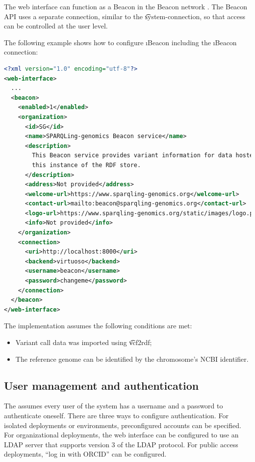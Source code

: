   The web interface can function as a Beacon in the Beacon network
  \citep{beacon-network}.  The Beacon API uses a separate connection,
  similar to the \t{system-connection}, so that access can be
  controlled at the user level.

  The following example shows how to configure \i{Beacon} including the
  \i{Beacon connection}:

\begin{lstlisting}[language=XML]
<?xml version="1.0" encoding="utf-8"?>
<web-interface>
  ...
  <beacon>
    <enabled>1</enabled>
    <organization>
      <id>SG</id>
      <name>SPARQLing-genomics Beacon service</name>
      <description>
        This Beacon service provides variant information for data hosted by
        this instance of the RDF store.
      </description>
      <address>Not provided</address>
      <welcome-url>https://www.sparqling-genomics.org</welcome-url>
      <contact-url>mailto:beacon@sparqling-genomics.org</contact-url>
      <logo-url>https://www.sparqling-genomics.org/static/images/logo.png</logo-url>
      <info>Not provided</info>
    </organization>
    <connection>
      <uri>http://localhost:8000</uri>
      <backend>virtuoso</backend>
      <username>beacon</username>
      <password>changeme</password>
    </connection>
  </beacon>
</web-interface>
\end{lstlisting}

  The implementation assumes the following conditions are met:
  \begin{itemize}
  \item Variant call data was imported using \t{vcf2rdf};
  \item The reference genome can be identified by the chromosome's NCBI
    identifier.
  \end{itemize}

\subsection{User management and authentication}
\label{sec:authentication}

  The  assumes every user of the system has a username
  and a password to authenticate oneself. There are three ways to configure
  authentication.  For isolated deployments or environments, preconfigured
  accounts can be specified.  For organizational deployments, the web interface
  can be configured to use an LDAP server that supports version 3 of the LDAP
  protocol.  For public access deployments, ``log in with ORCID'' can be
  configured.

